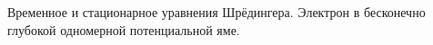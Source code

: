 \documentclass[__main__.tex]{subfiles}
\begin{document}
Временное и стационарное уравнения Шрёдингера. Электрон в бесконечно глубокой одномерной потенциальной яме.\\ 

\end{document}
